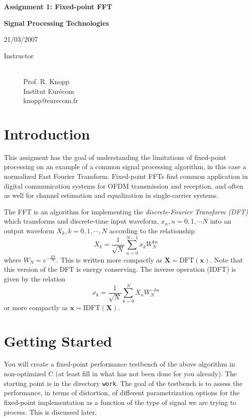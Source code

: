 \documentclass[11pt]{article}
\begin{document}
\parindent 0cm
\centerline{\Large\bf Assignment 1: Fixed-point FFT}
\centerline{\Large\bf Signal Processing Technologies}
\centerline{\large 21/03/2007}
\makeatletter
\begin{description}
\item[Instructor] \mbox{}\\
Prof. R. Knopp\\
Institut Eur\'ecom\\
knopp@eurecom.fr
\end{description}
\section{Introduction}
This assigment has the goal of understanding the limitations of fixed-point processing on an 
example of a common signal processing algorithm, in this case a normalized Fast Fourier Transform.
Fixed-point FFTs find common application in digital communication systems for OFDM transmission and
reception, and often as well for channel estimation and equalization in single-carrier systems. 

The FFT is an algorithm for implementing the {\em discrete-Fourier Transform (DFT)} which transforms
and discrete-time input waveform, $x_{n}, n=0,1,\cdots N$ into an output waveform $X_{k}, k=0,1,\cdots,N$
according to the relationship
\begin{equation}
X_{k} = \frac{1}{\sqrt{N}}\sum_{n=0}^{N-1}x_{k}W_{N}^{kn}
\end{equation}
where $W_{N} = e^{-\frac{j2\pi}{N}}$.  This is written more compactly as $\mathbf{X} = \mathrm{DFT}(\mathbf{x})$. 
Note that this version of the DFT is energy conserving.  The inverse operation (IDFT) is given by the relation
\begin{equation}
x_{k} = \frac{1}{\sqrt{N}}\sum_{k=0}^{N}X_{n}W_{N}^{-kn}
\end{equation}
or more compactly as $\mathbf{x} = \mathrm{IDFT}(\mathbf{X})$.  

\section{Getting Started}

You will create a fixed-point performance testbench of the above algorithm in non-optimized C (at least fill in what
has not been done for you already). The starting point is in the directory {\tt work}.  The goal of the testbench is to
assess the performance, in terms of distortion, of different parametrization options for the fixed-point implementation
as a function of the type of signal we are trying to process.  This is discussed later.  
\end{document}
